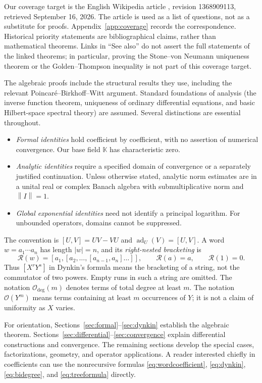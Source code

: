 \documentclass[11pt]{article}
\theoremstyle{definition}
\theoremstyle{remark}
\newcommand{\K}{\mathbb K}
\newcommand{\ad}{\operatorname{ad}}
\newcommand{\Rbr}{\mathcal R}
\newcommand{\norm}[1]{\left\lVert #1\right\rVert}
\newcommand{\smallO}{\mathcal O}
\numberwithin{equation}{section}
\begin{document}
Our coverage target is the English Wikipedia article \cite{wiki}, revision 1368909113, retrieved September 16, 2026. The article is used as a list of questions, not as a substitute for proofs. Appendix~\ref{app:coverage} records the correspondence. Historical priority statements are bibliographical claims, rather than mathematical theorems. Links in ``See also'' do not assert the full statements of the linked theorems; in particular, proving the Stone--von Neumann uniqueness theorem or the Golden--Thompson inequality is not part of this coverage target.

The algebraic proofs include the structural results they use, including the relevant Poincar\'e--Birkhoff--Witt argument. Standard foundations of analysis (the inverse function theorem, uniqueness of ordinary differential equations, and basic Hilbert-space spectral theory) are assumed. Several distinctions are essential throughout.
\begin{itemize}
\item \emph{Formal identities} hold coefficient by coefficient, with no assertion of numerical convergence. Our base field $\K$ has characteristic zero.
\item \emph{Analytic identities} require a specified domain of convergence or a separately justified continuation. Unless otherwise stated, analytic norm estimates are in a unital real or complex Banach algebra with submultiplicative norm and $\norm{I}=1$.
\item \emph{Global exponential identities} need not identify a principal logarithm. For unbounded operators, domains cannot be suppressed.
\end{itemize}
The convention is $[U,V]=UV-VU$ and $\ad_U(V)=[U,V]$. A word $w=a_1\cdots a_n$ has length $|w|=n$, and its \emph{right-nested bracketing} is
\begin{equation}\label{eq:rightbracket}
 \Rbr(w)=[a_1,[a_2,\ldots,[a_{n-1},a_n]\ldots]],
 \qquad \Rbr(a)=a,\qquad \Rbr(1)=0.
\end{equation}
Thus $[X^rY^s]$ in Dynkin's formula means the bracketing of a string, not the commutator of two powers. Empty runs in such a string are omitted. The notation $\smallO_{\deg}(m)$ denotes terms of total degree at least $m$. The notation $\smallO(Y^m)$ means terms containing at least $m$ occurrences of $Y$; it is not a claim of uniformity as $X$ varies.

For orientation, Sections~\ref{sec:formal}--\ref{sec:dynkin} establish the algebraic theorem. Sections~\ref{sec:differential}--\ref{sec:convergence} explain differential constructions and convergence. The remaining sections develop the special cases, factorizations, geometry, and operator applications. A reader interested chiefly in coefficients can use the nonrecursive formulas \eqref{eq:wordcoefficient}, \eqref{eq:dynkin}, \eqref{eq:bidegree}, and \eqref{eq:treeformula} directly.
\end{document}
